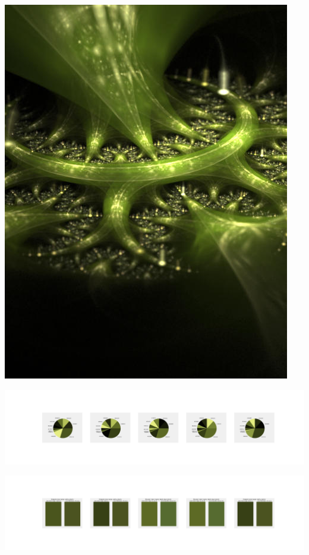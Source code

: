 \documentclass[11pt]{article}
\begin{document}
\begin{landscape}
    \begin{center}
    \includegraphics[width=\textwidth]{./nbimg/file (16).jpg}
    \end{center}

    \begin{center}
    \includegraphics[width=250mm]{./nbimg/pie-67.jpg}
    \end{center}

    \begin{center}
    \includegraphics[width=250mm]{./nbimg/peak-67.jpg}
    \end{center}
    


\end{landscape}
\end{document}
